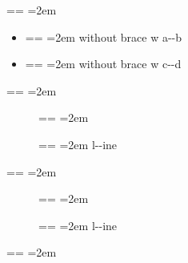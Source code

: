 \documentclass{book}
\makeatletter
\newenvironment{GNUTexinfopreformatted}{%
  \par\obeylines\obeyspaces\frenchspacing
  \parskip=\z@\parindent=\z@}{}
\makeatother
\begin{document}
\begin{GNUTexinfopreformatted}
\leftskip=2em\relax\ttfamily%

\end{GNUTexinfopreformatted}
\begin{itemize}[label={}]
\item \begin{GNUTexinfopreformatted}
\leftskip=2em\relax\ttfamily%
without brace w a{-}{-}b
\end{GNUTexinfopreformatted}
\item \begin{GNUTexinfopreformatted}
\leftskip=2em\relax\ttfamily%
without brace w c{-}{-}d
\end{GNUTexinfopreformatted}
\end{itemize}
\begin{GNUTexinfopreformatted}
\leftskip=2em\relax\ttfamily%

\end{GNUTexinfopreformatted}
\begin{description}
\item[] \begin{GNUTexinfopreformatted}
\leftskip=2em\relax\ttfamily%
\end{GNUTexinfopreformatted}
\item[{\parbox[b]{\linewidth}{%
a}}]
\begin{GNUTexinfopreformatted}
\leftskip=2em\relax\ttfamily%
l{-}{-}ine
\end{GNUTexinfopreformatted}
\end{description}
\begin{GNUTexinfopreformatted}
\leftskip=2em\relax\ttfamily%

\end{GNUTexinfopreformatted}
\begin{description}
\item[] \begin{GNUTexinfopreformatted}
\leftskip=2em\relax\ttfamily%
\end{GNUTexinfopreformatted}
\item[{\parbox[b]{\linewidth}{%
a--missing style formatting}}]
\begin{GNUTexinfopreformatted}
\leftskip=2em\relax\ttfamily%
l{-}{-}ine
\end{GNUTexinfopreformatted}
\end{description}
\begin{GNUTexinfopreformatted}
\leftskip=2em\relax\ttfamily%

\end{GNUTexinfopreformatted}
\end{document}
